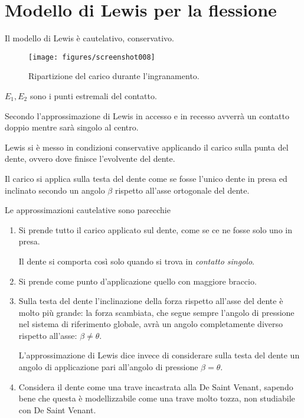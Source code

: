 \documentclass[a4paper, 15pt]{article}
\begin{document}
\section{Modello di Lewis per la flessione}
\begin{adjustwidth}{2in}{}
Il modello di Lewis è cautelativo, conservativo. 
\begin{figure}[H]
	\centering
	\texttt{[image: figures/screenshot008]}
	\caption{Ripartizione del carico durante l'ingranamento.}
	\label{fig:screenshot008}
\end{figure}
$E_1, E_2$ sono i punti estremali del contatto. 

Secondo l'approssimazione di Lewis  in accesso e in recesso avverrà un contatto doppio mentre sarà singolo al centro. \newline 

Lewis si è messo in condizioni conservative applicando il carico sulla punta del dente, ovvero dove finisce l'evolvente del dente. 

Il carico si applica sulla testa del dente come se fosse l'unico dente in presa ed inclinato secondo un angolo $\beta$ rispetto all'asse ortogonale del dente. \newline 

Le approssimazioni cautelative sono parecchie 
\begin{enumerate}
	\item Si prende tutto il carico applicato sul dente, come se ce ne fosse solo uno in presa. 
	
	Il dente si comporta così solo quando si trova in \textit{contatto singolo}. 
	
	\item Si prende come punto d'applicazione quello con maggiore braccio. 
	
	\item Sulla testa del dente l'inclinazione della forza rispetto all'asse del dente è molto più grande: la forza  scambiata, che segue sempre l'angolo di pressione nel sistema di riferimento globale, avrà un angolo completamente diverso rispetto all'asse: $\beta\ne\theta$.
	
	L'approssimazione di Lewis dice invece di considerare sulla testa del dente un angolo di applicazione pari all'angolo di pressione $\beta=\theta$. 
	
	\item Considera il dente come una trave incastrata alla De Saint Venant, sapendo bene che questa è modellizzabile come una trave molto tozza, non studiabile con De Saint Venant. 
\end{enumerate}


\end{adjustwidth}
\end{document}
